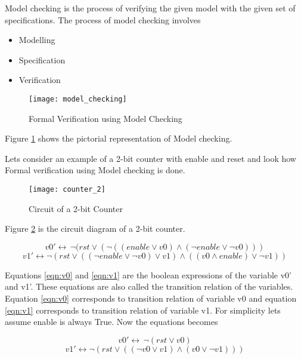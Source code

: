 Model checking is the process of verifying the given model with the given set of specifications. The process of model checking involves
\begin{itemize}
\item Modelling
\item Specification
\item Verification
\end{itemize}

\begin{figure}[h]
\centering
\texttt{[image: model\_checking]}
\caption{Formal Verification using Model Checking}
\label{fig:sample_model_checking}
\end{figure}

Figure \ref{fig:sample_model_checking} shows the pictorial representation of Model checking.

Lets consider an example of a 2-bit counter with enable and reset and look how Formal verification using Model checking is done.\newline

\begin{figure}
\texttt{[image: counter\_2]}
\caption{Circuit of a 2-bit Counter}
\label{fig:2-bit Counter}
\end{figure}

Figure \ref{fig:2-bit Counter} is the circuit diagram of a 2-bit counter.

\begin{equation}
v0'\leftrightarrow\,\neg (rst\lor(\neg((enable\lor v0)\land(\neg enable\lor\neg v0)))
\label{eqn:v0}
\end{equation}
\begin{equation}
v1'\leftrightarrow \neg (rst\lor ((\neg enable\lor\neg v0)\lor v1)\land((v0\land enable)\lor \neg v1))
\label{eqn:v1}
\end{equation}

Equations \ref{eqn:v0} and \ref{eqn:v1} are the boolean expressions of the variable v0' and v1'. These equations are also called the transition relation of the variables. Equation \ref{eqn:v0} corresponds to transition relation of variable v0 and equation \ref{eqn:v1} corresponds to transition relation of variable v1. For simplicity lets assume enable is always True. Now the equations becomes

\begin{equation}
v0'\leftrightarrow\,\neg (rst\lor v0)
\label{eqn:v0_1}
\end{equation}
\begin{equation}
v1'\leftrightarrow \neg (rst\lor ((\neg v0 \lor v1)\land(v0 \lor \neg v1)))
\label{eqn:v1_1}
\end{equation}

